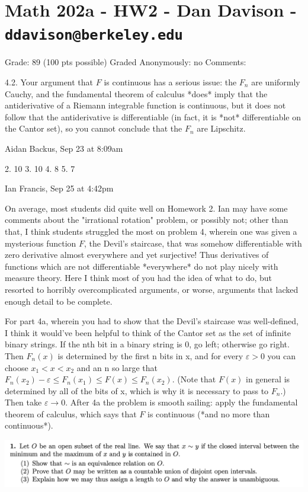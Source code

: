 \section*{Math 202a - HW2 - Dan Davison - \texttt{ddavison@berkeley.edu}}

Grade: 89 (100 pts possible)
Graded Anonymously: no
Comments:

4.2. Your argument that $F$ is continuous has a serious issue: the $F_n$ are uniformly Cauchy, and the
fundamental theorem of calculus *does* imply that the antiderivative of a Riemann integrable function is
continuous, but it does not follow that the antiderivative is differentiable (in fact, it is *not*
differentiable on the Cantor set), so you cannot conclude that the $F_n$ are Lipschitz.

Aidan Backus, Sep 23 at 8:09am

2. 10 3. 10 4. 8 5. 7

Ian Francis, Sep 25 at 4:42pm


On average, most students did quite well on Homework 2. Ian may have some comments about the "irrational rotation" problem, or possibly not; other than that, I think students struggled the most on problem 4, wherein one was given a mysterious function $F$, the Devil's staircase, that was somehow differentiable with zero derivative almost everywhere and yet surjective! Thus derivatives of functions which are not differentiable *everywhere* do not play nicely with measure theory. Here I think most of you had the idea of what to do, but resorted to horribly overcomplicated arguments, or worse, arguments that lacked enough detail to be complete.

For part 4a, wherein you had to show that the Devil's staircase was well-defined, I think it would've been helpful to think of the Cantor set as the set of infinite binary strings. If the nth bit in a binary string is 0, go left; otherwise go right. Then $F_n(x)$ is determined by the first n bits in x, and for every $\varepsilon > 0$ you can choose $x_1 < x < x_2$ and an n so large that $F_n(x_2) - \varepsilon \leq F_n(x_1) \leq F(x) \leq F_n(x_2)$. (Note that $F(x)$ in general is determined by all of the bits of x, which is why it is necessary to pass to $F_n$.) Then take $\varepsilon \to 0$. After 4a the problem is smooth sailing: apply the fundamental theorem of calculus, which says that $F$ is continuous (*and no more than continuous*).


\begin{mdframed}
  \includegraphics[width=400pt]{img/analysis--berkeley-202a-ebe4.png}
\end{mdframed}

